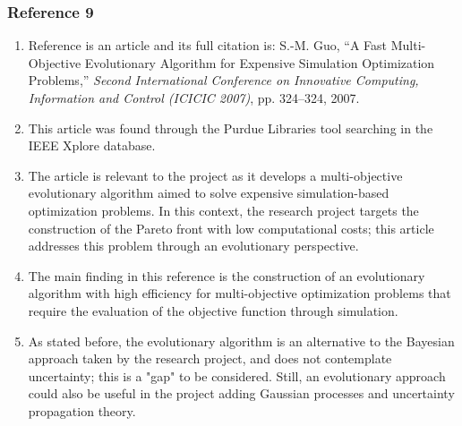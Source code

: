 \documentclass{journal}
\begin{document}
\subsubsection{Reference 9}
\begin{enumerate}
	\item Reference \cite{Guo2007} is an article and its full citation is: S.-M. Guo, “A Fast Multi-Objective Evolutionary Algorithm for Expensive Simulation Optimization Problems,” \textit{Second International Conference on Innovative Computing, Information and Control (ICICIC 2007)}, pp. 324–324, 2007.
	\item This article was found through the Purdue Libraries tool searching in the IEEE Xplore database.
	\item The article is relevant to the project as it develops a multi-objective evolutionary algorithm aimed to solve expensive simulation-based optimization problems. In this context, the research project targets the construction of the Pareto front with low computational costs; this article addresses this problem through an evolutionary perspective.
	\item The main finding in this reference is the construction of an evolutionary algorithm with high efficiency for multi-objective optimization problems that require the evaluation of the objective function through simulation.
	\item As stated before, the evolutionary algorithm is an alternative to the Bayesian approach taken by the research project, and does not contemplate uncertainty; this is a "gap" to be considered. Still, an evolutionary approach could also be useful in the project adding Gaussian processes and uncertainty propagation theory.
\end{enumerate}
\end{document}
